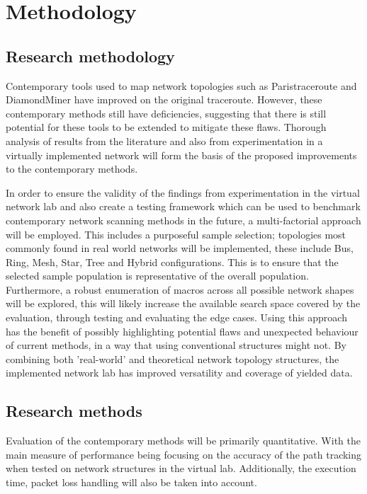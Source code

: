 \section{Methodology}

\subsection{Research methodology}

Contemporary tools used to map network topologies such as Paristraceroute\cite{anomalies} and DiamondMiner\cite{diamond-miner} have improved on the original traceroute. However, these contemporary methods still have deficiencies, suggesting that there is still potential for these tools to be extended to mitigate these flaws. Thorough analysis of results from the literature and also from experimentation in a virtually implemented network will form the basis of the proposed improvements to the contemporary methods. 

In order to ensure the validity of the findings from experimentation in the virtual network lab and also create a testing framework which can be used to benchmark contemporary network scanning methods in the future, a multi-factorial approach will be employed. This includes a purposeful sample selection; topologies most commonly found in real world networks will be implemented, these include Bus, Ring, Mesh, Star, Tree and Hybrid configurations. This is to ensure that the selected sample population is representative of the overall population. Furthermore, a robust enumeration of macros across all possible network shapes will be explored, this will likely increase the available search space covered by the evaluation, through testing and evaluating the edge cases. Using this approach has the benefit of possibly highlighting potential flaws and unexpected behaviour of current methods, in a way that using conventional structures might not. By combining both  'real-world' and theoretical network topology structures, the implemented network lab has improved versatility and coverage of yielded data.  

\subsection{Research methods}
Evaluation of the contemporary methods will be primarily quantitative. With the main measure of performance being focusing on the accuracy of the path tracking when tested on network structures in the virtual lab. Additionally, the execution time, packet loss handling  will also be taken into account.

